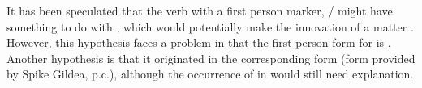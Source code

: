 %

It has been speculated that the \trio {} verb with a first person  marker, /  might have something to do with \akuriyo {}, which would potentially make the innovation of  a \PTir matter \parencite[116]{meira1998proto}.
However, this hypothesis faces a problem in that the first person form for \akuriyo {} is  \parencite[88]{gildea1994akuriyo}.
Another hypothesis is that it originated in the corresponding \kaxui form  (form provided by Spike Gildea, p.c.), although the occurrence of  in \trio would still need explanation.

